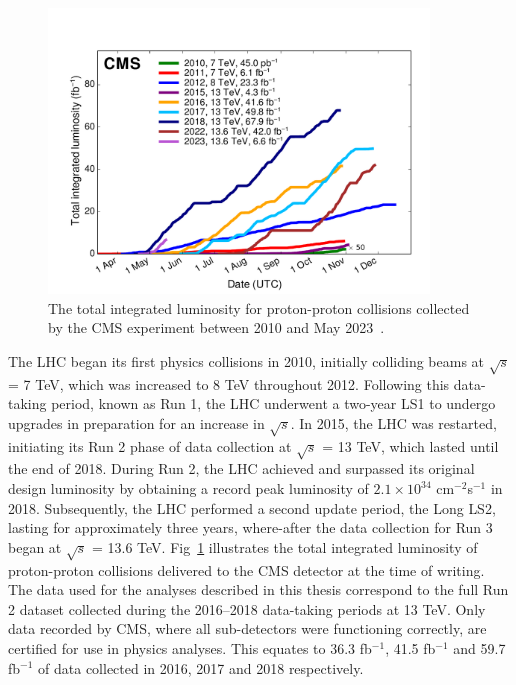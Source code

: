 \begin{figure}[h]
    \centering
    \includegraphics[width=0.9\textwidth]{Figures/int_lumi_cumulative_pp_2.pdf}
    \caption{The total integrated luminosity for proton-proton collisions collected by the \ac{CMS} experiment between 2010 and May 2023~\cite{}.}
    \label{fig:int_lumi}
\end{figure}

The \ac{LHC} began its first physics collisions in 2010, initially colliding beams at $\sqrt{s}$ = 7 TeV, which was increased to 8 TeV throughout 2012. 
Following this data-taking period, known as Run 1, the \ac{LHC} underwent a two-year \ac{LS1} to undergo upgrades in preparation for an increase in $\sqrt{s}$. 
In 2015, the \ac{LHC} was restarted, initiating its Run 2 phase of data collection at $\sqrt{s}$ = 13 TeV, which lasted until the end of 2018. 
During Run 2, the \ac{LHC} achieved and surpassed its original design luminosity by obtaining a record peak luminosity of $2.1\times10^{34}$ cm$^{−2}$s$^{−1}$ in 2018.
Subsequently, the \ac{LHC} performed a second update period, the Long \ac{LS2}, lasting for approximately three years, where-after the data collection for Run 3 began at $\sqrt{s}$ = 13.6 TeV.
Fig~\ref{fig:int_lumi} illustrates the total integrated luminosity of proton-proton collisions delivered to the \ac{CMS} detector at the time of writing.
The data used for the analyses described in this thesis correspond to the full Run 2 dataset collected during the 2016--2018 data-taking periods at 13 TeV. 
Only data recorded by \ac{CMS}, where all sub-detectors were functioning correctly, are certified for use in physics analyses. 
This equates to 36.3 fb$^{−1}$, 41.5 fb$^{−1}$ and 59.7 fb$^{-1}$ of data collected in 2016, 2017 and 2018 respectively. \\


